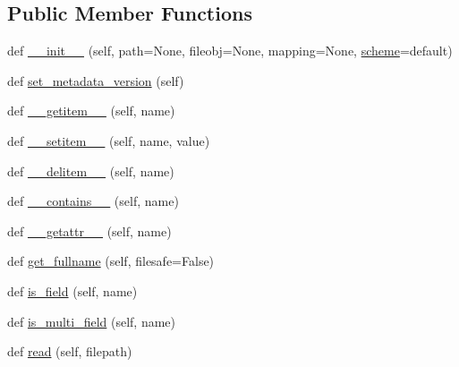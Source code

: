 \subsection*{Public Member Functions}
\begin{DoxyCompactItemize}
\item 
def \hyperlink{classpip_1_1__vendor_1_1distlib_1_1metadata_1_1LegacyMetadata_a3870519deea05c5d4cfe0e4c5401f163}{\+\_\+\+\_\+init\+\_\+\+\_\+} (self, path=None, fileobj=None, mapping=None, \hyperlink{classpip_1_1__vendor_1_1distlib_1_1metadata_1_1LegacyMetadata_ab3f060c78a87e7f63c7d3dc1dcc1857e}{scheme}=\textquotesingle{}default\textquotesingle{})
\item 
def \hyperlink{classpip_1_1__vendor_1_1distlib_1_1metadata_1_1LegacyMetadata_a2b8a6958321255c88868aa43ac509a85}{set\+\_\+metadata\+\_\+version} (self)
\item 
def \hyperlink{classpip_1_1__vendor_1_1distlib_1_1metadata_1_1LegacyMetadata_ac912c1fc83eaa1d62506deb954f22e30}{\+\_\+\+\_\+getitem\+\_\+\+\_\+} (self, name)
\item 
def \hyperlink{classpip_1_1__vendor_1_1distlib_1_1metadata_1_1LegacyMetadata_a247dd6e5ed048e357c5880358e484de9}{\+\_\+\+\_\+setitem\+\_\+\+\_\+} (self, name, value)
\item 
def \hyperlink{classpip_1_1__vendor_1_1distlib_1_1metadata_1_1LegacyMetadata_a59c07d597463b894a5fd536e43063435}{\+\_\+\+\_\+delitem\+\_\+\+\_\+} (self, name)
\item 
def \hyperlink{classpip_1_1__vendor_1_1distlib_1_1metadata_1_1LegacyMetadata_a82b15ecf2fa1194019c299d19b3c0280}{\+\_\+\+\_\+contains\+\_\+\+\_\+} (self, name)
\item 
def \hyperlink{classpip_1_1__vendor_1_1distlib_1_1metadata_1_1LegacyMetadata_a60dc58bdfe2edba33f54a4a785bc838c}{\+\_\+\+\_\+getattr\+\_\+\+\_\+} (self, name)
\item 
def \hyperlink{classpip_1_1__vendor_1_1distlib_1_1metadata_1_1LegacyMetadata_ad6eb77c6423f7f003959745708ca5ff6}{get\+\_\+fullname} (self, filesafe=False)
\item 
def \hyperlink{classpip_1_1__vendor_1_1distlib_1_1metadata_1_1LegacyMetadata_a4fe0f9dd6ff38c8ae53e29ea5348dbec}{is\+\_\+field} (self, name)
\item 
def \hyperlink{classpip_1_1__vendor_1_1distlib_1_1metadata_1_1LegacyMetadata_ac53bdf681203c4f3881634019dd92271}{is\+\_\+multi\+\_\+field} (self, name)
\item 
def \hyperlink{classpip_1_1__vendor_1_1distlib_1_1metadata_1_1LegacyMetadata_aa96840cee4fb98753e6c51cabd43425d}{read} (self, filepath)

\end{DoxyCompactItemize}
